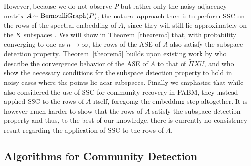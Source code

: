 \documentclass[12pt]{article}
\begin{document}
However, because we do not observe $P$ but rather only the noisy
adjacency matrix $A \sim \mathrm{BernoulliGraph}(P)$, the natural approach then is
to perform SSC on the rows of the spectral embedding of \(A\), 
since they will still lie approximately on the $K$ subspaces 
\citep{rubindelanchy2017statistical}. 
We will show in Theorem~\ref{theorem5} that, with probability converging to
one as $n \rightarrow \infty$, the rows of the ASE of $A$ also
satisfy the subspace detection property. 
Theorem~\ref{theorem5} builds upon existing work by
\citet{rubindelanchy2017statistical} who describe the convergence
behavior of the ASE of \(A\) to that of \(\tilde{\Pi} XU\), and
\citet{jmlr-v28-wang13} who show the necessary conditions for the
subspace detection property to hold in noisy cases where the points lie
near subspaces. Finally we emphasize that while
\citet{noroozi2019estimation} also considered the use of SSC for
community recovery in PABM, they instead applied SSC to the rows of
\(A\) itself, foregoing
the embedding step altogether. It is however much harder to show that
the rows of $A$ satisfy the subspace detection property and thus, to
the best of our knowledge, there is currently no consistency result
regarding the application of SSC to the rows of $A$. 

\hypertarget{community-detection}{%
\subsection{Algorithms for Community Detection}\label{community-detection}}
\end{document}
